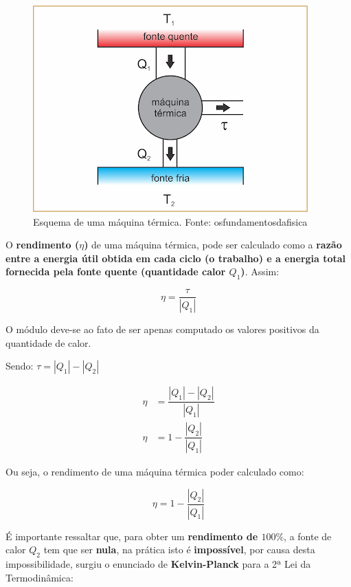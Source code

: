 \documentclass[12pt]{article}
\begin{document}
\begin{figure}[h]{}
\centering\includegraphics[width=2.5truein]{img14.png}
\caption{Esquema de uma máquina térmica. Fonte: osfundamentosdafisica}
\centering
\end{figure}

O \textbf{rendimento ($\eta$)} de uma máquina térmica, pode ser calculado como a \textbf{razão entre a energia útil obtida em cada ciclo (o trabalho) e a energia total fornecida pela fonte quente (quantidade calor $Q_{1}$)}. Assim:


\begin{equation*}
    \eta = \dfrac{\tau}{|Q_{1}|}
\end{equation*}


O módulo deve-se ao fato de ser apenas computado os valores positivos da quantidade de calor.


Sendo: $\tau = |Q_{1}| - |Q_{2}|$


\begin{align*}
    \eta &= \dfrac{|Q_{1}|-|Q_{2}|}{|Q_{1}|} \\
    \eta &= 1 - \dfrac{|Q_{2}|}{|Q_{1}|}
\end{align*}


Ou seja, o rendimento de uma máquina térmica poder calculado como:


\begin{equation}
    \eta = 1 - \dfrac{|Q_{2}|}{|Q_{1}|}
\end{equation}


É importante ressaltar que, para obter um \textbf{rendimento de $100\%$}, a fonte de calor $Q_{2}$ tem que ser \textbf{nula}, na prática isto é \textbf{impossível}, por causa desta impossibilidade, surgiu o enunciado de \textbf{Kelvin-Planck} para a 2ª Lei da Termodinâmica:
\end{document}
